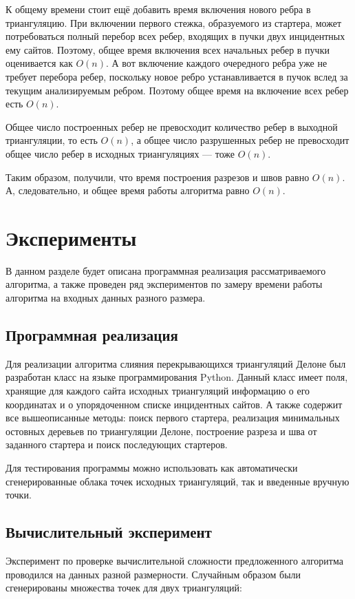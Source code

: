 \documentclass[12pt]{article}
\begin{document}
К общему времени стоит ещё добавить время включения нового ребра в триангуляцию.
При включении первого стежка, образуемого из стартера, может потребоваться полный перебор всех ребер, входящих в пучки двух инцидентных ему сайтов. Поэтому, общее время включения всех начальных ребер в пучки оценивается как $O(n)$.
А вот включение каждого очередного ребра уже не требует перебора ребер,
поскольку новое ребро устанавливается в пучок вслед за текущим анализируемым ребром.
Поэтому общее время на включение всех ребер есть $O(n)$.

Общее число построенных ребер не превосходит количество ребер в выходной триангуляции, то есть $O(n)$,
а общее число разрушенных ребер не превосходит общее число ребер в исходных триангуляциях --- тоже $O(n)$.

Таким образом, получили, что время построения разрезов и швов равно $O(n)$.
А, следовательно, и общее время работы алгоритма равно $O(n)$.

\section{Эксперименты}
В данном разделе будет описана программная реализация рассматриваемого алгоритма,
а также проведен ряд экспериментов по замеру времени работы алгоритма на входных данных разного размера.

\subsection{Программная реализация}
Для реализации алгоритма слияния перекрывающихся триангуляций Делоне был разработан класс
на языке программирования Python.
Данный класс имеет поля, хранящие для каждого сайта исходных триангуляций информацию о его координатах
и о упорядоченном списке инцидентных сайтов.
А также содержит все вышеописанные методы:
поиск первого стартера, реализация минимальных остовных деревьев по триангуляции Делоне,
построение разреза и шва от заданного стартера и поиск последующих стартеров.

Для тестирования программы можно использовать как автоматически сгенерированные облака точек исходных триангуляций,
так и введенные вручную точки.

\subsection{Вычислительный эксперимент}
Эксперимент по проверке вычислительной сложности предложенного алгоритма проводился на данных разной размерности.
Случайным образом были сгенерированы множества точек для двух триангуляций:
\end{document}
